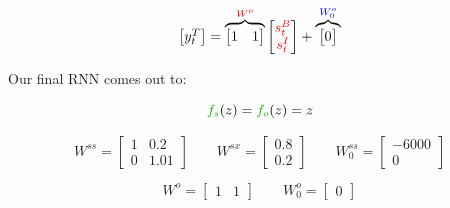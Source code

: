         \begin{equation}
            \begin{bmatrix}
                y_t^{T}
            \end{bmatrix}
            =
            \overbrace{
                \begin{bmatrix}
                    1 & 1 
                \end{bmatrix}
            }^{\textcolor{red}{W^o}}
            \begin{bmatrix}
                \textcolor{red}{s^{B}_t} \\ \textcolor{red}{s^{I}_t}
            \end{bmatrix}
            +
            \overbrace{
            \begin{bmatrix}
                0
            \end{bmatrix}
            }^{\textcolor{blue}{W^o_0}}
        \end{equation}

        \begin{remark}
            Our final RNN comes out to:

            \begin{equation*}
                \grn{f_s}(z)=\grn{f_o}(z)=z
            \end{equation*}

            \begin{equation*}
                W^{ss} = \begin{bmatrix}
                    1 & 0.2 \\ 
                    0 & 1.01
                \end{bmatrix} \qquad
                W^{sx} = \begin{bmatrix}
                    0.8 \\ 0.2
                \end{bmatrix} \qquad
                W^{ss}_0 = \begin{bmatrix}
                    -6000 \\ 0
                \end{bmatrix}
            \end{equation*}

            \begin{equation*}
                W^{o} = \begin{bmatrix}
                    1 & 1
                \end{bmatrix} \qquad
                W^{o}_0 =\begin{bmatrix}
                    0
                \end{bmatrix}
            \end{equation*}
        \end{remark}




